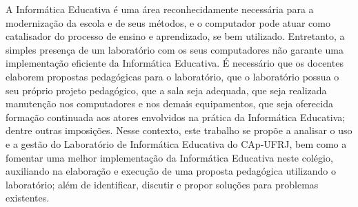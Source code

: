 A Informática Educativa é uma área reconhecidamente necessária para a modernização da escola e de seus métodos, e o computador pode atuar como catalisador do processo de ensino e aprendizado, se bem utilizado. Entretanto, a simples presença de um laboratório com os seus computadores não garante uma implementação eficiente da Informática Educativa. É necessário que os docentes elaborem propostas pedagógicas para o laboratório, que o laboratório possua o seu próprio projeto pedagógico, que a sala seja adequada, que seja realizada manutenção nos computadores e nos demais equipamentos, que seja oferecida formação continuada aos atores envolvidos na prática da Informática Educativa; dentre outras imposições.
Nesse contexto, este trabalho se propõe a analisar o uso e a gestão do Laboratório de Informática Educativa do CAp-UFRJ, bem como a fomentar uma melhor implementação da Informática Educativa neste colégio, auxiliando na elaboração e execução de uma proposta pedagógica utilizando o laboratório; além de identificar, discutir e propor soluções para problemas existentes.